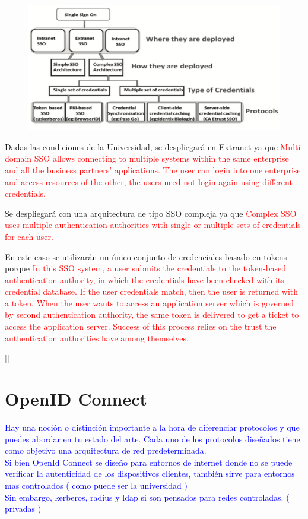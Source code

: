 \begin{figure}[H]
	\centering
	\includegraphics[width=0.7\linewidth]{Graphics/sso_types}
	\caption{}
	\label{fig:Tipos de SSO}
\end{figure}

Dadas las condiciones de la Universidad, se despliegará en Extranet ya que \textcolor{red}{Multi-domain SSO allows connecting to multiple systems within the same enterprise and all the business partners’ applications. The user can login into one enterprise and access resources of the other, the users need not login again using different credentials.}

Se despliegará con una arquitectura de tipo SSO compleja ya que \textcolor{red}{Complex SSO uses multiple authentication authorities with single or multiple sets of credentials for each user.}

En este caso se utilizarán un único conjunto de credenciales basado en tokens porque \textcolor{red}{In this SSO system, a user submits the credentials to the token-based authentication authority, in which the credentials have been checked with its credential database. If the user credentials match, then the user is returned with a token. When the user wants to access an application server which is governed by second authentication authority, the same token is delivered to get a ticket to access the application server. Success of this process relies on the trust the authentication authorities have among themselves.}

[\cite{radha2012survey}]

\section{OpenID Connect}
\textcolor{blue}{Hay una noción o distinción importante a la hora de diferenciar protocolos y que puedes abordar en tu estado del arte. Cada uno de los protocolos diseñados tiene como objetivo una arquitectura de red predeterminada. \\
Si bien OpenId Connect se diseño para entornos de internet donde no se puede verificar la autenticidad de los dispositivos clientes, también sirve para entornos mas controlados ( como puede ser la universidad )\\
Sin embargo, kerberos, radius y ldap si son pensados para redes controladas. ( privadas )}


